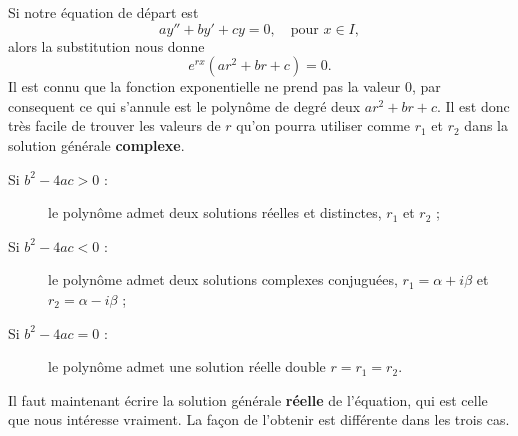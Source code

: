 Si notre équation de départ est 
\begin{equation}\label{eq_lin_ordre_deux_hom}
  ay'' + by' + cy = 0, \quad\text{pour } x\in I, 
\end{equation}
alors la substitution nous donne
\[
e^{rx}\left(ar^2+br+c\right)=0.
\]
Il est connu que la fonction exponentielle ne prend pas la valeur $0$, par consequent ce qui s'annule est le polynôme de degré deux $ar^2+br+c$. Il est donc très facile de trouver les valeurs de $r$ qu'on pourra utiliser comme $r_1$ et $r_2$ dans la solution générale \textbf{complexe}.
\begin{description}
  \item[Si $b^2 - 4ac >0$ :] le polynôme admet deux solutions réelles et distinctes, $r_1$ et $r_2$ ;
  \item[Si $b^2 - 4ac <0$ :] le polynôme admet deux solutions complexes conjuguées, $r_1 = \alpha + i \beta$ et $r_2 = \alpha - i \beta$ ;
  \item[Si $b^2 - 4ac =0$ :] le polynôme admet une solution réelle double $r=r_1 = r_2$.
\end{description}
Il faut maintenant écrire la solution générale \textbf{réelle} de l'équation, qui est celle que nous intéresse vraiment. La façon de l'obtenir est différente dans les trois cas.
